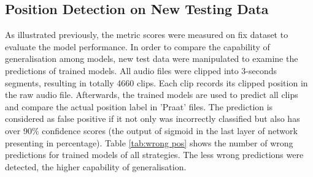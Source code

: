 \subsection{Position Detection on New Testing Data}
As illustrated previously, the metric scores were measured on fix dataset to evaluate the model performance. In order to compare the capability of generalisation among models, new test data were manipulated to examine the predictions of trained models. All audio files were clipped into 3-seconds segments, resulting in totally 4660 clips. Each clip records its clipped position in the raw audio file. Afterwards, the trained models are used to predict all clips and compare the actual position label in 'Praat' files. The prediction is considered as false positive if it not only was incorrectly classified but also has over 90\% confidence scores (the output of sigmoid in the last layer of network presenting in percentage). Table \ref{tab:wrong pos} shows the number of wrong predictions for trained models of all strategies. The less wrong predictions were detected, the higher capability of generalisation.\par
\begin{table}[htp]
    \centering
    \caption{Wrong predicted positions of two models}
    \label{tab:wrong pos}
\end{table}
